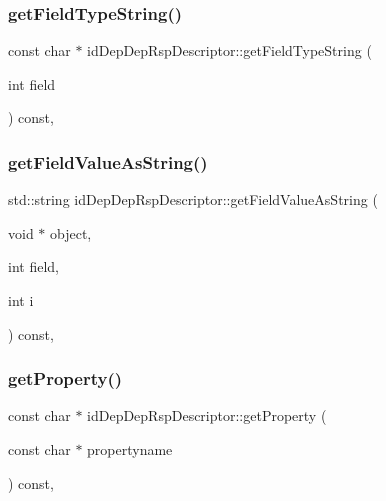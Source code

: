 \subsubsection{\texorpdfstring{get\+Field\+Type\+String()}{getFieldTypeString()}}
{\footnotesize\ttfamily const char $\ast$ id\+Dep\+Dep\+Rsp\+Descriptor\+::get\+Field\+Type\+String (\begin{DoxyParamCaption}\item[{int}]{field }\end{DoxyParamCaption}) const\hspace{0.3cm}{\ttfamily [override]}, {\ttfamily [virtual]}}

\mbox{\label{classid_dep_dep_rsp_descriptor_a3f78b6586d3e0239bf8a530398d6db8c}} 
\subsubsection{\texorpdfstring{get\+Field\+Value\+As\+String()}{getFieldValueAsString()}}
{\footnotesize\ttfamily std\+::string id\+Dep\+Dep\+Rsp\+Descriptor\+::get\+Field\+Value\+As\+String (\begin{DoxyParamCaption}\item[{void $\ast$}]{object,  }\item[{int}]{field,  }\item[{int}]{i }\end{DoxyParamCaption}) const\hspace{0.3cm}{\ttfamily [override]}, {\ttfamily [virtual]}}

\mbox{\label{classid_dep_dep_rsp_descriptor_ad149f4ccae414eb97ce9959fe4b852c7}} 
\subsubsection{\texorpdfstring{get\+Property()}{getProperty()}}
{\footnotesize\ttfamily const char $\ast$ id\+Dep\+Dep\+Rsp\+Descriptor\+::get\+Property (\begin{DoxyParamCaption}\item[{const char $\ast$}]{propertyname }\end{DoxyParamCaption}) const\hspace{0.3cm}{\ttfamily [override]}, {\ttfamily [virtual]}}

